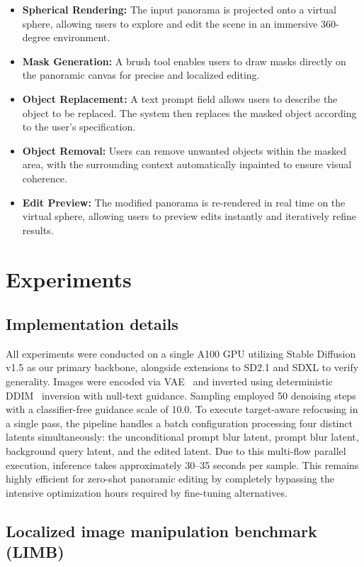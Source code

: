 \documentclass[runningheads]{llncs}
\begin{document}
\begin{itemize}
\item \textbf{Spherical Rendering:} The input panorama is projected onto a virtual sphere, allowing users to explore and edit the scene in an immersive 360-degree environment.
\item \textbf{Mask Generation:} A brush tool enables users to draw masks directly on the panoramic canvas for precise and localized editing.
\item \textbf{Object Replacement:} A text prompt field allows users to describe the object to be replaced. The system then replaces the masked object according to the user’s specification.
\item \textbf{Object Removal:} Users can remove unwanted objects within the masked area, with the surrounding context automatically inpainted to ensure visual coherence.
\item \textbf{Edit Preview:} The modified panorama is re-rendered in real time on the virtual sphere, allowing users to preview edits instantly and iteratively refine results.
\end{itemize}


\section{Experiments}

\subsection{Implementation details}
All experiments were conducted on a single A100 GPU utilizing Stable Diffusion v1.5 as our primary backbone, alongside extensions to SD2.1 and SDXL to verify generality. Images were encoded via VAE~\cite{kingma2014auto} and inverted using deterministic DDIM~\cite{song2020denoising} inversion with null-text guidance. Sampling employed 50 denoising steps with a classifier-free guidance scale of 10.0. To execute target-aware refocusing in a single pass, the pipeline handles a batch configuration processing four distinct latents simultaneously: the unconditional prompt blur latent, prompt blur latent, background query latent, and the edited latent. Due to this multi-flow parallel execution, inference takes approximately 30--35 seconds per sample. This remains highly efficient for zero-shot panoramic editing by completely bypassing the intensive optimization hours required by fine-tuning alternatives.


\subsection{Localized image manipulation benchmark (LIMB)} 
\label{imba}
\end{document}
